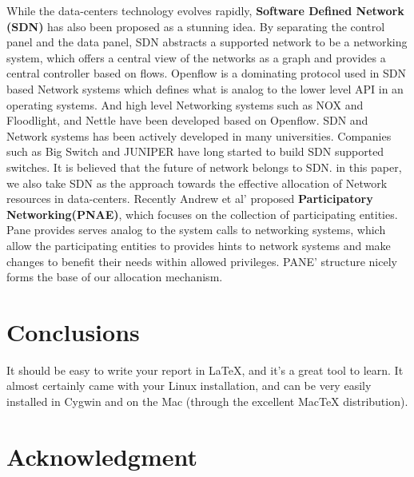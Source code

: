 \documentclass[a4paper,11pt,twocolumn]{article}
\begin{document}
While the data-centers technology evolves rapidly, \textbf{Software Defined Network (SDN)} has also been proposed as a
stunning idea. By separating the control panel and the data panel, SDN   abstracts a supported network to be a networking system, which
offers a central view of the networks as a graph and provides a central controller based on flows.
Openflow is a dominating protocol used in SDN based Network systems which defines what is analog to the lower level API in an operating systems.
And high level Networking systems  such as NOX\cite{nox} and Floodlight\cite{floodlight}, and Nettle\cite{nettle} have been developed based on Openflow. SDN and
Network systems has been actively developed in many universities. Companies such as Big Switch and JUNIPER have long 
started to build SDN supported switches. It is believed that the future of network belongs to SDN. in this paper, we also take SDN as the approach towards the effective allocation of Network resources in data-centers. Recently Andrew et al' proposed 	\textbf{Participatory Networking(PNAE)}\cite{andrew}, 
which focuses on the collection of participating entities.  Pane provides serves    analog to the system calls to networking systems, which 
allow the  participating entities to provides hints to network systems and make changes to benefit their needs within allowed privileges.
PANE' structure  nicely forms the base of our allocation mechanism. 

\section{Conclusions}

It should be easy to write your report in LaTeX, and it's a great tool
to learn. It almost certainly came with your Linux installation, and
can be very easily installed in Cygwin and on the Mac (through the
excellent MacTeX distribution).


\section{Acknowledgment}
\end{document}
